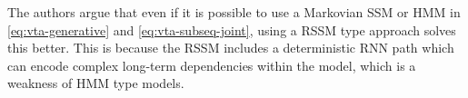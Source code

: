 The authors argue that even if it is possible to use a Markovian SSM or HMM in \cref{eq:vta-generative} and \cref{eq:vta-subseq-joint}, using a RSSM type approach solves this better. 
This is because the RSSM includes a deterministic RNN path which can encode complex long-term dependencies within the model, which is a weakness of HMM type models. 

